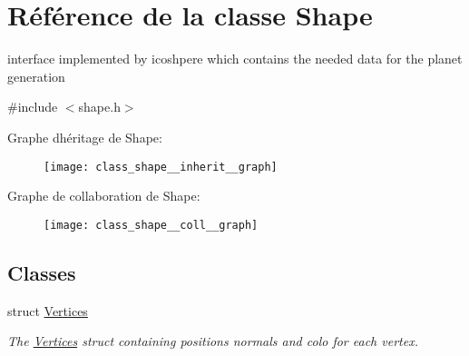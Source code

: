 \hypertarget{class_shape}{}\section{Référence de la classe Shape}
\label{class_shape}


interface implemented by icoshpere which contains the needed data for the planet generation  




{\ttfamily \#include $<$shape.\+h$>$}



Graphe d\textquotesingle{}héritage de Shape\+:
\nopagebreak
\begin{figure}[H]
\begin{center}
\leavevmode
\texttt{[image: class\_shape\_\_inherit\_\_graph]}
\end{center}
\end{figure}


Graphe de collaboration de Shape\+:
\nopagebreak
\begin{figure}[H]
\begin{center}
\leavevmode
\texttt{[image: class\_shape\_\_coll\_\_graph]}
\end{center}
\end{figure}
\subsection*{Classes}
\begin{DoxyCompactItemize}
\item 
struct \hyperlink{struct_shape_1_1_vertices}{Vertices}
\begin{DoxyCompactList}\small\item\em The \hyperlink{struct_shape_1_1_vertices}{Vertices} struct containing positions normals and colo for each vertex. \end{DoxyCompactList}\end{DoxyCompactItemize}
